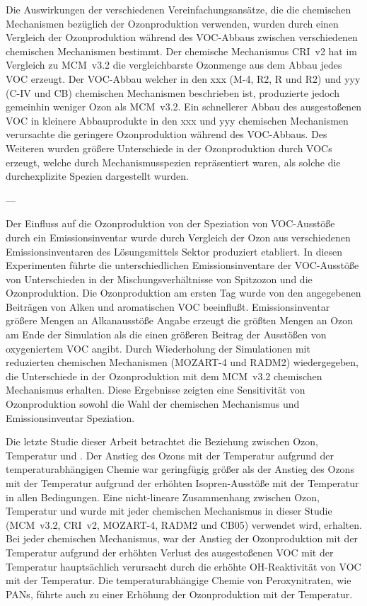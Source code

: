 Die Auswirkungen der verschiedenen Vereinfachungsansätze, die die chemischen Mechanismen bezüglich der Ozonproduktion verwenden, wurden durch einen Vergleich der Ozonproduktion während des VOC-Abbaus zwischen verschiedenen chemischen Mechanismen bestimmt.
Der chemische Mechanismus CRI~v2 hat im Vergleich zu  MCM~v3.2 die vergleichbarste Ozonmenge aus dem Abbau jedes VOC erzeugt. Der VOC-Abbau welcher in den xxx (M-4, R2, R und R2) und yyy (C-IV und CB) chemischen Mechanismen beschrieben ist, produzierte jedoch gemeinhin weniger Ozon als MCM~v3.2. 
Ein schnellerer Abbau des ausgestoßenen VOC in kleinere Abbauprodukte in den xxx und yyy chemischen Mechanismen verursachte die geringere Ozonproduktion während des VOC-Abbaus. 
Des Weiteren wurden größere Unterschiede in der Ozonproduktion durch VOCs erzeugt, welche durch Mechanismusspezien repräsentiert waren, als solche die durchexplizite Spezien dargestellt wurden.

---

Der Einfluss auf die Ozonproduktion von der Speziation von VOC-Ausstöße durch ein Emissionsinventar wurde durch Vergleich der Ozon aus verschiedenen Emissionsinventaren des Lösungsmittels Sektor produziert etabliert.
In diesen Experimenten führte die unterschiedlichen Emissionsinventare der VOC-Ausstöße von Unterschieden in der Mischungsverhältnisse von Spitzozon und die Ozonproduktion.
Die Ozonproduktion am ersten Tag wurde von den angegebenen Beiträgen von Alken und aromatischen VOC beeinflußt.
Emissionsinventar größere Mengen an Alkanausstöße Angabe erzeugt die größten Mengen an Ozon am Ende der Simulation als die einen größeren Beitrag der Ausstößen von oxygeniertem VOC angibt.
Durch Wiederholung der Simulationen mit reduzierten chemischen Mechanismen (MOZART-4 und RADM2) wiedergegeben, die Unterschiede in der Ozonproduktion mit dem MCM~v3.2 chemischen Mechanismus erhalten.
Diese Ergebnisse zeigten eine Sensitivität von Ozonproduktion sowohl die Wahl der chemischen Mechanismus und Emissionsinventar Speziation.

Die letzte Studie dieser Arbeit betrachtet die Beziehung zwischen Ozon, Temperatur und .
Der Anstieg des Ozons mit der Temperatur aufgrund der temperaturabhängigen Chemie war geringfügig größer als der Anstieg des Ozons mit der Temperatur aufgrund der erhöhten Isopren-Ausstöße mit der Temperatur in allen  Bedingungen.
Eine nicht-lineare Zusammenhang zwischen Ozon, Temperatur und  wurde mit jeder chemischen Mechanismus in dieser Studie (MCM~v3.2, CRI~v2, MOZART-4, RADM2 und CB05) verwendet wird, erhalten.
Bei jeder chemischen Mechanismus, war der Anstieg der Ozonproduktion mit der Temperatur aufgrund der erhöhten Verlust des ausgestoßenen VOC mit der Temperatur hauptsächlich verursacht durch die erhöhte OH-Reaktivität von VOC mit der Temperatur.
Die temperaturabhängige Chemie von Peroxynitraten, wie PANs, führte auch zu einer Erhöhung der Ozonproduktion mit der Temperatur.

